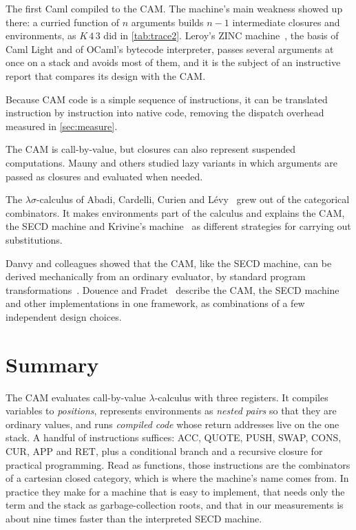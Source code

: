 \documentclass[11pt,a4paper]{article}
\newcommand{\ins}[1]{\textsf{#1}}
\theoremstyle{definition}
\theoremstyle{plain}
\begin{document}
\begin{description}[style=nextline, leftmargin=1.2em, itemsep=3pt]
\item[Caml.] The first Caml compiled to the CAM. The machine's main weakness
  showed up there: a curried function of $n$ arguments builds $n-1$
  intermediate closures and environments, as $K\,4\,3$ did in
  \cref{tab:trace2}. Leroy's ZINC machine~\cite{leroy90}, the basis of Caml
  Light and of OCaml's bytecode interpreter, passes several arguments at once
  on a stack and avoids most of them, and it is the subject of an instructive
  report that compares its design with the CAM.
\item[Compiling the CAM further.] Because CAM code is a simple sequence of
  instructions, it can be translated instruction by instruction into native
  code, removing the dispatch overhead measured in \cref{sec:measure}.
\item[Lazy evaluation.] The CAM is call-by-value, but closures can also
  represent suspended computations. Mauny and others studied lazy variants
  in which arguments are passed as closures and evaluated when needed.
\item[Explicit substitutions.] The $\lambda\sigma$-calculus of Abadi, Cardelli,
  Curien and Lévy~\cite{acl91} grew out of the categorical combinators. It
  makes environments part of the calculus and explains the CAM, the SECD
  machine and Krivine's machine~\cite{krivine07} as different strategies for
  carrying out substitutions.
\item[Derivation.] Danvy and colleagues showed that the CAM, like the SECD
  machine, can be derived mechanically from an ordinary evaluator, by
  standard program transformations~\cite{ager03b}. Douence and
  Fradet~\cite{douence98} describe the CAM, the SECD machine and other
  implementations in one framework, as combinations of a few independent
  design choices.
\end{description}

\section{Summary}

The CAM evaluates call-by-value $\lambda$-calculus with three registers. It
compiles variables to \emph{positions}, represents environments as
\emph{nested pairs} so that they are ordinary values, and runs
\emph{compiled code} whose return addresses live on the one stack. A
handful of instructions suffices: \ins{ACC}, \ins{QUOTE}, \ins{PUSH},
\ins{SWAP}, \ins{CONS}, \ins{CUR}, \ins{APP} and \ins{RET}, plus a conditional
branch and a recursive closure for practical programming. Read as functions,
those instructions are the combinators of a cartesian closed category, which
is where the machine's name comes from. In practice they make for a machine
that is easy to implement, that needs only the term and the stack as
garbage-collection roots, and that in our measurements is about nine times
faster than the interpreted SECD machine.
\end{document}

